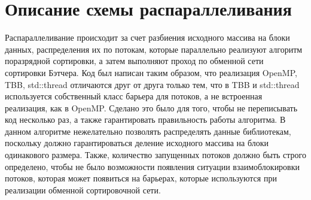\documentclass{report}
\begin{document}
\newpage

\section*{Описание схемы распараллеливания}
\par Распараллеливание происходит за счет разбиения исходного массива на блоки данных, распределения их по потокам, которые параллельно реализуют алгоритм поразрядной сортировки, а затем выполняют проход по обменной сети сортировки Бэтчера. Код был написан таким образом, что реализация OpenMP, TBB, std::thread отличаются друг от друга только тем, что в TBB и std::thread используется собственный класс барьера для потоков, а не встроенная реализация, как в OpenMP. Сделано это было для того, чтобы не переписывать код несколько раз, а также гарантировать правильность работы алгоритма. В данном алгоритме нежелательно позволять распределять данные библиотекам, поскольку должно гарантироваться деление исходного массива на блоки одинакового размера. Также, количество запущенных потоков должно быть строго определено, чтобы не было возможности появления ситуации взаимоблокировки потоков, которая может появиться на барьерах, которые используются при реализации обменной сортировочной сети.

\newpage

\end{document}
